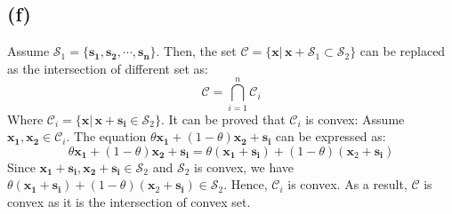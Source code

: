 \documentclass[10pt,a4paper]{article}
\begin{document}
\subsection*{(f)}
Assume $\mathcal{S}_{1} = \{ \mathbf{s_{1}}, \mathbf{s_{2}}, \cdots, \mathbf{s_{n}} \}$. Then, the set $\mathcal{C} =  \{ \mathbf{x} |\, \mathbf{x} + \mathcal{S}_{1} \subset \mathcal{S}_{2} \}$ can be replaced as the intersection of different set as:
\begin{equation*}
	\mathcal{C} = \displaystyle\bigcap_{i = 1}^{n}\mathcal{C}_{i}
\end{equation*}
Where $\mathcal{C}_{i} = \{ \mathbf{x} |\, \mathbf{x} + \mathbf{s_{i}} \in \mathcal{S}_{2} \}$. It can be proved that $\mathcal{C}_{i}$ is convex: Assume $\mathbf{x_{1}}, \mathbf{x_{2}} \in \mathcal{C}_{i}$. The equation $\theta \mathbf{x_{1}} + (1 - \theta) \mathbf{x_{2}} + \mathbf{s_{i}}$ can be expressed as:
\begin{equation*}
	\theta \mathbf{x_{1}} + (1 - \theta) \mathbf{x_{2}} + \mathbf{s_{i}} = \theta(\mathbf{x_{1}} + \mathbf{s_{i}})  + (1 - \theta) (\mathbf{x}_{2} + \mathbf{s_{i}})
\end{equation*}
Since $\mathbf{x_{1}} + \mathbf{s_{i}}, \mathbf{x_{2}} + \mathbf{s_{i}} \in \mathcal{S}_{2}$ and $\mathcal{S}_{2}$ is convex, we have $\theta(\mathbf{x_{1}} + \mathbf{s_{i}})  + (1 - \theta) (\mathbf{x}_{2} + \mathbf{s_{i}}) \in \mathcal{S}_{2}$. Hence, $\mathcal{C}_{i}$ is convex. As a result, $\mathcal{C}$ is convex as it is the intersection of convex set.
\end{document}

